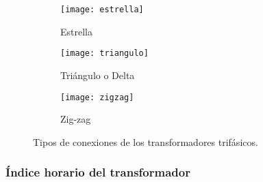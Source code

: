 \begin{figure}[H]
	\centering
	\begin{subfigure}[b]{.2\linewidth}
		\texttt{[image: estrella]}
		\caption{Estrella}
	\end{subfigure}
	\begin{subfigure}[b]{.2\linewidth}
		\texttt{[image: triangulo]}
		\caption{Triángulo o Delta}
	\end{subfigure}
	\begin{subfigure}[b]{.2\linewidth}
		\texttt{[image: zigzag]}
		\caption{Zig-zag}
	\end{subfigure}
	\caption{Tipos de conexiones de los transformadores trifásicos.}
\end{figure}

\subsubsection{Índice horario del transformador}